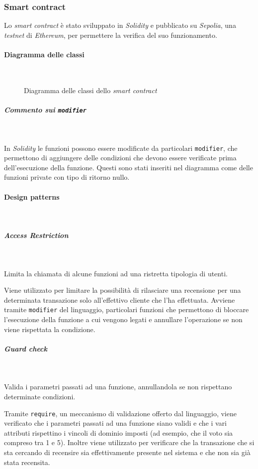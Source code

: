 \subsubsection{Smart contract}

Lo \textit{smart contract} è stato sviluppato in \textit{Solidity} e pubblicato su \textit{Sepolia}, una \textit{testnet} di \textit{Ethereum}, per permettere la verifica del suo funzionamento.

\paragraph{Diagramma delle classi}~
\begin{figure}[H]
    
    \caption{Diagramma delle classi dello \textit{smart contract}}\label{fig:contract}
\end{figure}
\subparagraph*{Commento sui \texttt{modifier}}~

\noindent In \textit{Solidity} le funzioni possono essere modificate da particolari \texttt{modifier}, che permettono di aggiungere delle condizioni che devono essere verificate prima dell'esecuzione della funzione. Questi sono stati inseriti nel diagramma come delle funzioni private con tipo di ritorno nullo.

\paragraph{Design patterns}~
\subparagraph*{Access Restriction}~

\noindent Limita la chiamata di alcune funzioni ad una ristretta tipologia di utenti.

Viene utilizzato per limitare la possibilità di rilasciare una recensione per una determinata transazione solo all'effettivo cliente che l'ha effettuata. Avviene tramite \texttt{modifier} del linguaggio, particolari funzioni che permettono di bloccare l'esecuzione della funzione a cui vengono legati e annullare l'operazione se non viene rispettata la condizione.

\subparagraph*{Guard check}~

\noindent Valida i parametri passati ad una funzione, annullandola se non rispettano determinate condizioni.

Tramite \texttt{require}, un meccanismo di validazione offerto dal linguaggio, viene verificato che i parametri passati ad una funzione siano validi e che i vari attributi rispettino i vincoli di dominio imposti (ad esempio, che il voto sia compreso tra 1 e 5). Inoltre viene utilizzato per verificare che la transazione che si sta cercando di recensire sia effettivamente presente nel sistema e che non sia già stata recensita.


